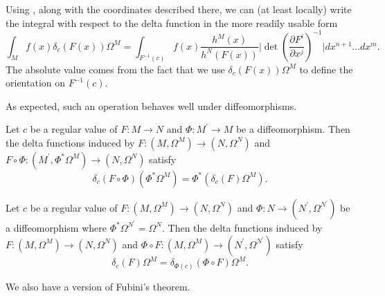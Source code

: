 Using , along with the coordinates described there, we can (at least locally) write the integral with respect to the delta function in the more readily usable form
\begin{equation}\label{delta_integral_coords}
\int_M f(x)\delta_c(F(x))\Omega^M=\int_{F^{-1}(c)} f(x)\frac{h^M(x)}{h^N(F(x))}\bigg|\det \left(\frac{\partial F^i}{\partial x^j}\right)^{-1}\bigg|dx^{n+1}...dx^m.
\end{equation}
The absolute value comes from the fact that we use $\delta_c(F(x))\Omega^M$ to define the orientation on $F^{-1}(c)$.


As expected, such an operation behaves well under diffeomorphisms.
\begin{lemma}\label{diffeo_property}
Let $c$ be a regular value of $F:M\rightarrow N$ and $\Phi:M^{'}\rightarrow M$ be a diffeomorphism.  Then the delta functions induced by $F:(M,\Omega^M)\rightarrow (N,\Omega^N)$ and $F\circ\Phi:(M^{'},\Phi^*\Omega^M)\rightarrow  (N,\Omega^N)$ satisfy
\begin{equation}
\delta_c(F\circ\Phi)(\Phi^*\Omega^M)=\Phi^*(\delta_c(F)\Omega^M).
\end{equation}
\end{lemma}

\begin{lemma}
Let $c$ be a regular value of $F:(M,\Omega^M)\rightarrow (N,\Omega^N)$ and $\Phi:N\rightarrow (N^{'},\Omega^{N^{'}})$ be a diffeomorphism where $\Phi^*\Omega^{N^{'}}=\Omega^N$.  Then the delta functions induced by $F:(M,\Omega^M)\rightarrow (N,\Omega^N)$ and $\Phi\circ F:(M,\Omega^M)\rightarrow (N^{'},\Omega^{N^{'}})$ satisfy
\begin{equation}
\delta_c(F)\Omega^M=\delta_{\Phi(c)}(\Phi\circ F)\Omega^M.
\end{equation}
\end{lemma}

We also have a version of Fubini's theorem.

